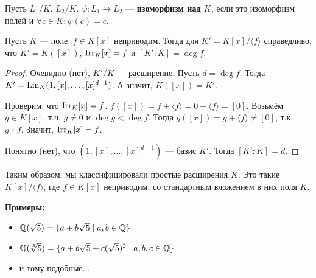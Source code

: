 \begin{conj}
    Пусть $L_1 / K$, $L_2 / K$. $\psi : L_1 \to L_2$ --- \textbf{изоморфизм над $K$}, если это изоморфизм полей и $\forall c \in K : \psi(c) = c$. 
\end{conj}

\begin{theorem}
    Пусть $K$ --- поле, $f \in K[x]$ неприводим. Тогда для $K' = K[x] / \langle f \rangle$ справедливо, что $K' = K([x])$, $\operatorname{Irr}_K [x] = f$ и $[K' : K] = \deg f$.
\end{theorem}
\begin{proof}
    Очевидно (нет), $K' / K$ --- расширение. Пусть $d = \deg f$. Тогда \\ $K' = \operatorname{Lin}_K(1, [x], \dots, [x]^{d-1})$. А значит, $K([x]) = K'$.

    Проверим, что $\operatorname{Irr}_K [x] = f$. $f([x]) = f + \langle f \rangle =
    0 + \langle f \rangle = [0]$. Возьмём $g \in K[x]$, т.ч. $g \neq 0$ и $\deg g < \deg f$. Тогда $g([x]) = g + \langle f \rangle \neq [0]$, т.к. $g \nmid f$. Значит, $\operatorname{Irr}_K [x] = f$.

    Понятно (нет), что $(1, [x], \dots, [x]^{d-1})$ --- базис $K'$.
    Тогда $[K' : K] = d$.
\end{proof}

Таким образом, мы классифицировали простые расширения $K$. Это такие $K[x] / \langle f \rangle$, где $f \in K[x]$ неприводим, со стандартным вложением в них поля $K$.

\textbf{Примеры:}
\begin{itemize}
    \item $\mathbb{Q}(\sqrt{5}) = \{ a + b \sqrt{5} \mid a, b \in \mathbb{Q} \}$
    \item $\mathbb{Q}(\sqrt[3]{5}) = \{ a + b \sqrt{5} + c(\sqrt{5})^2 \mid a, b, c \in \mathbb{Q} \}$
    \item и тому подобные...
\end{itemize} 

